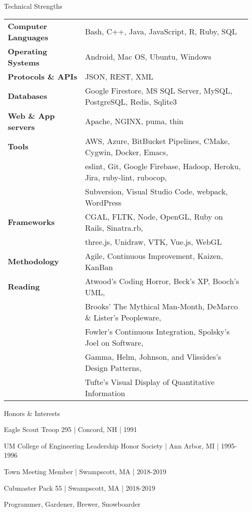 \documentclass{resume}
\begin{document}
\begin{rSection}{Technical Strengths}
\begin{tabular}{ @{} >{\bfseries}l @{\hspace{6ex}} l }
Computer Languages & Bash, C++, Java, JavaScript, R, Ruby, SQL \\
Operating Systems & Android, Mac OS, Ubuntu, Windows \\
Protocols \& APIs & JSON, REST, XML \\
Databases & Google Firestore, MS SQL Server, MySQL, PostgreSQL, Redis, Sqlite3 \\
Web \& App servers & Apache, NGINX, puma, thin \\
Tools & AWS, Azure, BitBucket Pipelines, CMake, Cygwin, Docker, Emacs, \\
 & eslint, Git, Google Firebase, Hadoop, Heroku, Jira, ruby-lint, rubocop, \\
 & Subversion, Visual Studio Code, webpack, WordPress \\
Frameworks & CGAL, FLTK, Node, OpenGL, Ruby on Rails, Sinatra.rb, \\
 & three.js, Unidraw, VTK, Vue.js, WebGL \\
Methodology & Agile, Continuous Improvement, Kaizen, KanBan \\
Reading & Atwood's Coding Horror, Beck's XP, Booch's UML, \\
 & Brooks' The Mythical Man-Month, DeMarco \& Lister's Peopleware, \\
 & Fowler's Continuous Integration, Spolsky's Joel on Software, \\
 & Gamma, Helm, Johnson, and Vlissides's Design Patterns, \\
 & Tufte's Visual Display of Quantitative Information
\end{tabular}
\end{rSection}

\begin{rSection}{Honors \& Interests}
\item Eagle Scout Troop 295 | Concord, NH | 1991
\item UM College of Engineering Leadership Honor Society | Ann Arbor, MI | 1995-1996
\item Town Meeting Member | Swampscott, MA | 2018-2019 
\item Cubmaster Pack 55 | Swampscott, MA | 2018-2019 
\item Programmer, Gardener, Brewer, Snowboarder
\end{rSection}
\end{document}
